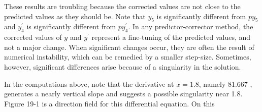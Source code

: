 \documentclass[10pt]{article}
\begin{document}
These results are troubling because the corrected values are not close to the predicted values as they should be. Note that $y_{5}$ is significantly different from $p y_{5}$ and $y_{4}^{\prime}$ is significantly different from $p y_{4}^{\prime}$. In any predictor-corrector method, the corrected values of $y$ and $y^{\prime}$ represent a fine-tuning of the predicted values, and not a major change. When significant changes occur, they are often the result of numerical instability, which can be remedied by a smaller step-size. Sometimes, however, significant differences arise because of a singularity in the solution.

In the computations above, note that the derivative at $x=1.8$, namely 81.667 , generates a nearly vertical slope and suggests a possible singularity near 1.8. Figure 19-1 is a direction field for this differential equation. On this
\end{document}

